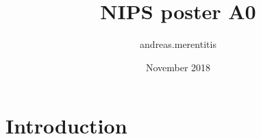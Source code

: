 \documentclass{article}
\title{NIPS poster A0}
\author{andreas.merentitis }
\date{November 2018}
\begin{document}
\maketitle

\section{Introduction}
\end{document}
